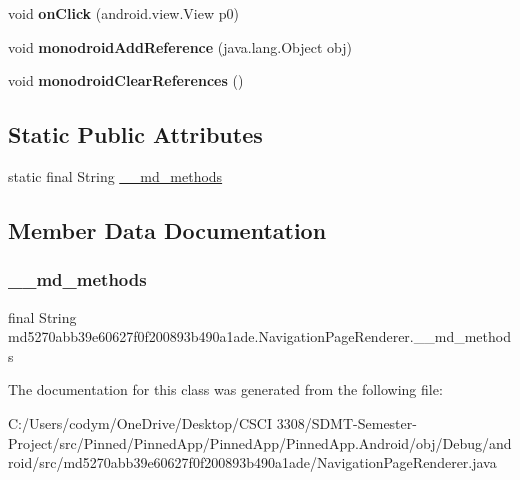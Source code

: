 \begin{DoxyCompactItemize}
void {\bfseries on\+Click} (android.\+view.\+View p0)
\item 
\mbox{\label{classmd5270abb39e60627f0f200893b490a1ade_1_1_navigation_page_renderer_a876162ea80dae791f8a70b5bc12ee81c}} 
void {\bfseries monodroid\+Add\+Reference} (java.\+lang.\+Object obj)
\item 
\mbox{\label{classmd5270abb39e60627f0f200893b490a1ade_1_1_navigation_page_renderer_a61d42127ac3ca068adc349d6a33af47a}} 
void {\bfseries monodroid\+Clear\+References} ()
\end{DoxyCompactItemize}
\subsection*{Static Public Attributes}
\begin{DoxyCompactItemize}
\item 
static final String \hyperlink{classmd5270abb39e60627f0f200893b490a1ade_1_1_navigation_page_renderer_af9b71b148669bb50bafafc240c856788}{\+\_\+\+\_\+md\+\_\+methods}
\end{DoxyCompactItemize}


\subsection{Member Data Documentation}
\mbox{\label{classmd5270abb39e60627f0f200893b490a1ade_1_1_navigation_page_renderer_af9b71b148669bb50bafafc240c856788}} 
\subsubsection{\texorpdfstring{\+\_\+\+\_\+md\+\_\+methods}{\_\_md\_methods}}
{\footnotesize\ttfamily final String md5270abb39e60627f0f200893b490a1ade.\+Navigation\+Page\+Renderer.\+\_\+\+\_\+md\+\_\+methods\hspace{0.3cm}{\ttfamily [static]}}



The documentation for this class was generated from the following file\+:\begin{DoxyCompactItemize}
\item 
C\+:/\+Users/codym/\+One\+Drive/\+Desktop/\+C\+S\+C\+I 3308/\+S\+D\+M\+T-\/\+Semester-\/\+Project/src/\+Pinned/\+Pinned\+App/\+Pinned\+App/\+Pinned\+App.\+Android/obj/\+Debug/android/src/md5270abb39e60627f0f200893b490a1ade/Navigation\+Page\+Renderer.\+java\end{DoxyCompactItemize}
